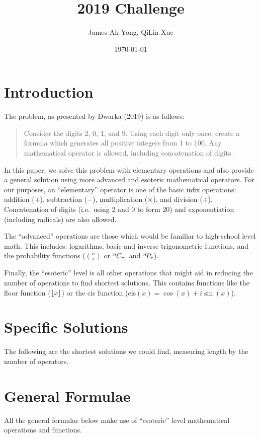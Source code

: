 \documentclass{article}
\title{2019 Challenge}
\author{James Ah Yong, QiLin Xue}
\date\today
\DeclarePairedDelimiter\floor{\lfloor}{\rfloor}
\newcommand*{\permcomb}[4][0mu]{{{}^{#3}\mkern#1#2_{#4}}}
\newcommand*{\perm}[1][-3mu]{\permcomb[#1]{P}}
\newcommand*{\comb}[1][-1mu]{\permcomb[#1]{C}}
\begin{document}
\maketitle

\section{Introduction}

The problem, as presented by Dwarka (2019) is as follows:

\begin{quotation}
  Consider the digits 2, 0, 1, and 9.
  Using each digit only once, create a formula which generates all positive integers from 1 to 100.
  Any mathematical operator is allowed, including concatenation of digits.
\end{quotation}

In this paper, we solve this problem with elementary operations and also provide a general solution using more advanced and esoteric mathematical operators.
For our purposes, an ``elementary'' operator is one of the basic infix operations: addition ($+$), subtraction ($-$), multiplication ($\times$), and division ($\div$). Concatenation of digits (i.e.\ using 2 and 0 to form 20) and exponentiation (including radicals) are also allowed.

The ``advanced'' operations are those which would be familiar to high-school level math. This includes: logarithms, basic and inverse trigonometric functions, and the probability functions ($\binom{n}{r}$ or $\comb{n}{r}$, and $\perm{n}{r}$).

Finally, the ``esoteric'' level is all other operations that might aid in reducing the number of operations to find shortest solutions. This contains functions like the floor function ($\floor{x}$) or the cis function ($\mathrm{cis}(x) = \cos(x) + i \sin(x)$).

\section{Specific Solutions}

The following are the shortest solutions we could find, measuring length by the number of operators.

\section{General Formulae}

All the general formulae below make use of ``esoteric'' level mathematical operations and functions.
\end{document}
